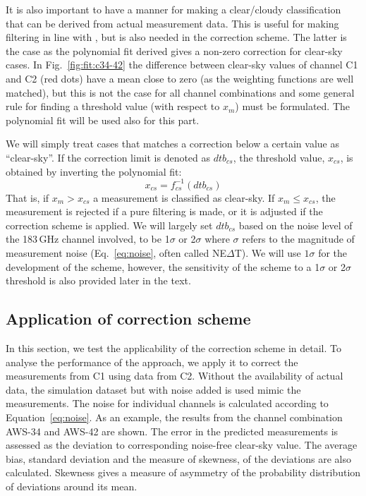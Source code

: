 \documentclass[12pt]{article}
\begin{document}
It is also important to have a manner for making a clear/cloudy classification
that can be derived from actual measurement data. This is useful for making
filtering in line with \citet{rekha2012potential}, but is also needed in the
correction scheme. The latter is the case as the polynomial fit derived gives a
non-zero correction for clear-sky cases. In Fig.~\ref{fig:fit:c34-42} the
difference between clear-sky values of channel C1 and C2 (red dots) have a mean
close to zero (as the weighting functions are well matched), but this is not
the case for all channel combinations and some general rule for finding a
threshold value (with respect to $x_m$) must be formulated. The polynomial fit
will be used also for this part.

We will simply treat cases that matches a correction below a certain value as
``clear-sky''. If the correction limit is denoted as $dtb_{cs}$, the threshold
value, $x_{cs}$, is obtained by inverting the polynomial fit:
\begin{equation}
x_{cs} = f_{cs}^{-1}(dtb_{cs}) 
\label{eq:dtb}
\end{equation}
That is, if $x_m>x_{cs}$ a measurement is classified as clear-sky. If
$x_m\leq x_{cs}$, the measurement is rejected if a pure filtering is made, or
it is adjusted if the correction scheme is applied. We will largely set
$dtb_{cs}$ based on the noise level of the 183\,GHz channel involved, to be
1$\sigma$ or 2$\sigma$ where $\sigma$ refers to the magnitude of measurement
noise (Eq.~\ref{eq:noise}, often called NE$\Delta$T). We will use $1\sigma$ for
the development of the scheme, however, the sensitivity of the scheme to
a 1$\sigma$ or 2$\sigma$ threshold is also provided later in the text.



\subsection{Application of correction scheme}
%
In this section, we test the applicability of the correction scheme in detail.
To analyse the performance of the approach, we apply it to correct the
measurements from C1 using data from C2. Without the availability of actual
data, the simulation dataset but with noise added is used mimic the measurements. The
noise for individual channels is calculated according to
Equation~\ref{eq:noise}. As an example, the results from the channel
combination AWS-34 and AWS-42 are shown. The error in the
predicted measurements is assessed as the deviation to corresponding noise-free
clear-sky value. The average bias, standard deviation and the measure of skewness, of the deviations are also calculated. Skewness gives a measure of asymmetry of the probability distribution of deviations around its mean.
\end{document}
